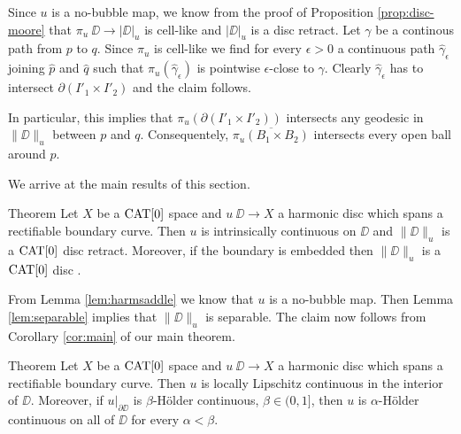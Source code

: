 \documentclass[a4paper,10pt]{amsart}
\begin{document}
Since $u$ is a no-bubble map, we know from the proof of Proposition \ref{prop:disc-moore} that $\pi_u\:\DD\to|\DD|_u$ is cell-like and 
$|\DD|_u$ is a disc retract. 
Let $\gamma$ be a continous path from $p$ to $q$. Since $\pi_u$ is cell-like we find for every $\epsilon>0$ a continuous path $\hat\gamma_\epsilon$ joining $\hat p$
and $\hat q$ such that $\pi_u(\hat\gamma_\epsilon)$ is pointwise $\epsilon$-close to $\gamma$. Clearly $\hat\gamma_\epsilon$ has to intersect 
$\partial( I'_1\times I'_2)$ and the claim follows.
\qeds

In particular, this implies that $\pi_u(\partial( I'_1\times I'_2))$ intersects any geodesic in $\|\DD\|_u$ between $p$ and $q$. 
Consequentely, $\overline{\pi_u(B_1\times B_2)}$ intersects every open ball around $p$.
\qeds





We arrive at the main results of this section.


\begin{thm}{Theorem}\label{thm:harmonic}
Let $X$ be a $\mathop{\rm CAT}\nolimits[0]$ space 
and $u\:\DD\to X$ a harmonic disc which spans a rectifiable boundary curve. 
Then $u$ is intrinsically continuous on $\DD$ and $\|\DD\|_u$ is a $\mathop{\rm CAT}\nolimits[0]$ disc retract. 
Moreover, if the boundary is embedded then $\|\DD\|_u$ is a $\mathop{\rm CAT}\nolimits[0]$ disc .
\end{thm}

From Lemma \ref{lem:harmsaddle} we know that $u$ is a no-bubble map. Then Lemma \ref{lem:separable} implies that 
$\|\DD\|_u$ is separable. The claim now follows from Corollary \ref{cor:main} of our main theorem.

\qeds



\begin{thm}{Theorem}\label{thm:Lipregularity}
Let $X$ be a $\mathop{\rm CAT}\nolimits[0]$ space 
and $u\:\DD\to X$ a harmonic disc which spans a rectifiable boundary curve. 
Then $u$ is locally Lipschitz continuous in the interior of $\DD$. 
Moreover, if $u|_{\partial\DD}$ is $\beta$-H\"older continuous, $\beta\in(0,1]$, then $u$ is $\alpha$-H\"older continuous on all of
$\DD$ for every $\alpha<\beta$.
\end{thm}
\end{document}
